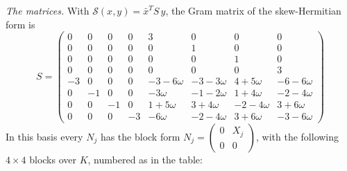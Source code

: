 \documentclass[11pt]{amsart}
\theoremstyle{definition}
\theoremstyle{remark}
\begin{document}
\emph{The matrices.} With $\mathcal S(x,y)=\bar x^{T}S\,y$, the Gram matrix of the skew-Hermitian form is
\[
S=\left(\begin{smallmatrix}0&0&0&0&3&0&0&0\\0&0&0&0&0&1&0&0\\0&0&0&0&0&0&1&0\\0&0&0&0&0&0&0&3\\-3&0&0&0&-3-6\omega&-3-3\omega&4+5\omega&-6-6\omega\\0&-1&0&0&-3\omega&-1-2\omega&1+4\omega&-2-4\omega\\0&0&-1&0&1+5\omega&3+4\omega&-2-4\omega&3+6\omega\\0&0&0&-3&-6\omega&-2-4\omega&3+6\omega&-3-6\omega\end{smallmatrix}\right)
\]
In this basis every $N_j$ has the block form $N_j=\left(\begin{smallmatrix}0&X_j\\0&0\end{smallmatrix}\right)$, with the following $4\times4$ blocks over $K$, numbered as in the table:
\end{document}
